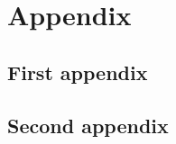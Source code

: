 \section{Appendix}\label{app}

\subsection{First appendix}\label{app:first}
\subsection{Second appendix}\label{app:second}
